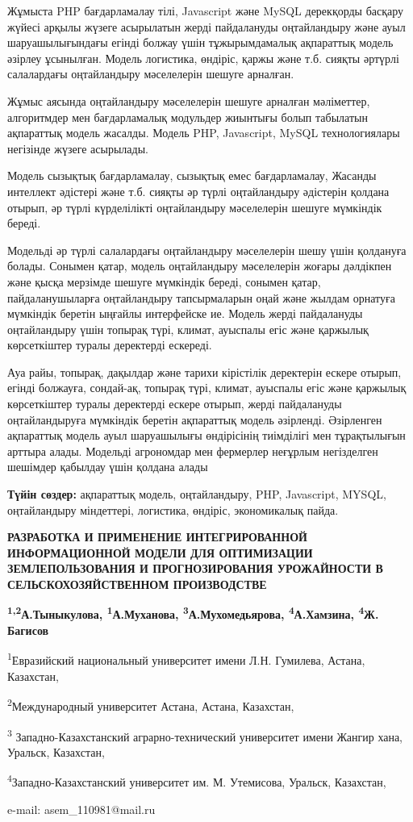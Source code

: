 Жұмыста PHP бағдарламалау тілі, Javascript және MySQL дерекқорды басқару
жүйесі арқылы жүзеге асырылатын жерді пайдалануды оңтайландыру және ауыл
шаруашылығындағы егінді болжау үшін тұжырымдамалық ақпараттық модель
әзірлеу ұсынылған. Модель логистика, өндіріс, қаржы және т.б. сияқты
әртүрлі салалардағы оңтайландыру мәселелерін шешуге арналған.

Жұмыс аясында оңтайландыру мәселелерін шешуге арналған мәліметтер,
алгоритмдер мен бағдарламалық модульдер жиынтығы болып табылатын
ақпараттық модель жасалды. Модель PHP, Javascript, MySQL технологиялары
негізінде жүзеге асырылады.

Модель сызықтық бағдарламалау, сызықтық емес бағдарламалау, Жасанды
интеллект әдістері және т.б. сияқты әр түрлі оңтайландыру әдістерін
қолдана отырып, әр түрлі күрделілікті оңтайландыру мәселелерін шешуге
мүмкіндік береді.

Модельді әр түрлі салалардағы оңтайландыру мәселелерін шешу үшін
қолдануға болады. Сонымен қатар, модель оңтайландыру мәселелерін жоғары
дәлдікпен және қысқа мерзімде шешуге мүмкіндік береді, сонымен қатар,
пайдаланушыларға оңтайландыру тапсырмаларын оңай және жылдам орнатуға
мүмкіндік беретін ыңғайлы интерфейске ие. Модель жерді пайдалануды
оңтайландыру үшін топырақ түрі, климат, ауыспалы егіс және қаржылық
көрсеткіштер туралы деректерді ескереді.

Ауа райы, топырақ, дақылдар және тарихи кірістілік деректерін ескере
отырып, егінді болжауға, сондай-ақ, топырақ түрі, климат, ауыспалы егіс
және қаржылық көрсеткіштер туралы деректерді ескере отырып, жерді
пайдалануды оңтайландыруға мүмкіндік беретін ақпараттық модель
әзірленді. Әзірленген ақпараттық модель ауыл шаруашылығы өндірісінің
тиімділігі мен тұрақтылығын арттыра алады. Модельді агрономдар мен
фермерлер неғұрлым негізделген шешімдер қабылдау үшін қолдана алады

{\bfseries Түйін сөздер:} ақпараттық модель, оңтайландыру, PHP, Javascript,
MYSQL, оңтайландыру міндеттері, логистика, өндіріс, экономикалық пайда.

\begin{center}
{\large\bfseries РАЗРАБОТКА И ПРИМЕНЕНИЕ ИНТЕГРИРОВАННОЙ ИНФОРМАЦИОННОЙ МОДЕЛИ
ДЛЯ ОПТИМИЗАЦИИ ЗЕМЛЕПОЛЬЗОВАНИЯ И ПРОГНОЗИРОВАНИЯ УРОЖАЙНОСТИ В
СЕЛЬСКОХОЗЯЙСТВЕННОМ ПРОИЗВОДСТВЕ}

{\bfseries \textsuperscript{1,2}А.Тыныкулова,
\textsuperscript{1}А.Муханова, \textsuperscript{3}А.Мухомедьярова,
\textsuperscript{4}А.Хамзина, \textsuperscript{4}Ж. Багисов}

\textsuperscript{1}Евразийский национальный университет имени Л.Н.
Гумилева, Астана, Казахстан,

\textsuperscript{2}Международный университет Астана, Астана, Казахстан,

\textsuperscript{3} Западно-Казахстанский аграрно-технический
университет имени Жангир хана, Уральск, Казахстан,

\textsuperscript{4}Западно-Казахстанский университет им. М. Утемисова,
Уральск, Казахстан,

e-mail: asem\_110981@mail.ru
\end{center}

